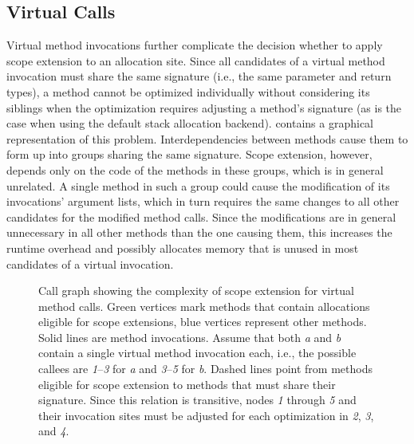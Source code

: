 		\subsection{Virtual Calls}
			\label{sub:eea:analysis:virtual}
			Virtual method invocations further complicate the decision whether to apply scope extension to an allocation site.
			Since all candidates of a virtual method invocation must share the same signature (i.e., the same parameter and
			return types), a method cannot be optimized individually without considering its siblings when the optimization
			requires adjusting a method's signature (as is the case when using the default stack allocation backend).
			 contains a graphical representation of this problem. Interdependencies between
			methods cause them to form up into groups sharing the same signature. Scope extension, however, depends only on
			the code of the methods in these groups, which is in general unrelated. A single method in such a group could
			cause the modification of its invocations' argument lists, which in turn requires the same changes to all other
			candidates for the modified method calls. Since the modifications are in general unnecessary in all other methods
			than the one causing them, this increases the runtime overhead and possibly allocates memory that is unused in
			most candidates of a virtual invocation.

			\begin{figure}
				\centering%

				\caption[Call graph showing the complexity of scope extension for virtual method calls]{%
					Call graph showing the complexity of scope extension for virtual method calls. Green
					{\color{cggreen}\blacksquare} vertices mark methods that contain allocations eligible for scope extensions,
					blue {\color{cgblue}\blacksquare} vertices represent other methods. Solid lines are method invocations. Assume
					that both \emph{a} and \emph{b} contain a single virtual method invocation each, i.e., the possible callees
					are \emph{1}–\emph{3} for \emph{a} and \emph{3}–\emph{5} for \emph{b}. Dashed lines point from methods
					eligible for scope extension to methods that must share their signature. Since this relation is transitive,
					nodes \emph{1} through \emph{5} and their invocation sites must be adjusted for each optimization in \emph{2},
					\emph{3}, and \emph{4}.}%
				\label{fig:eea:analysis:virtual}%
			\end{figure}

